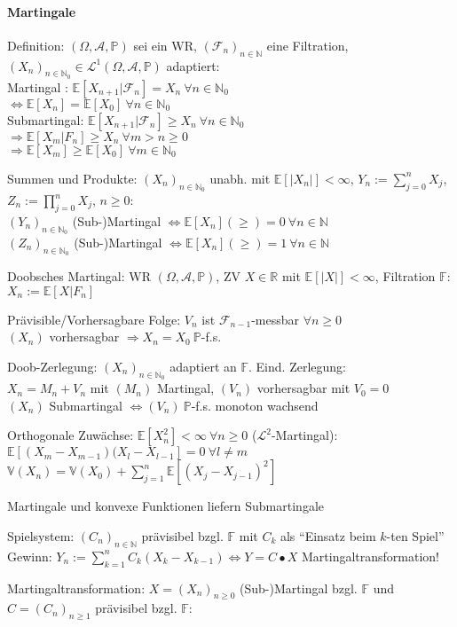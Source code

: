 \documentclass[a4paper,draft]{article}
\newcommand{\R}{\mathds{R}}
\newcommand{\N}{\mathds{N}}
\newcommand{\A}{\mathcal{A}}
\renewcommand{\P}{\mathds{P}}
\newcommand{\E}[1]{\mathds{E}[#1]}
\newcommand{\F}{\mathcal{F}}
\newcommand{\cE}[2]{\E{#1 | #2}}
\newcommand{\V}{\mathds{V}}
\newcommand{\parh}{\par\hangindent=0.5cm}
\renewcommand{\wr}{(\Omega,\A,\P)}
\begin{document}
\begin{multicols}{2}
\paragraph{Martingale}\hspace{0pt}\parh
Definition: $\wr$ sei ein WR, $(\F_n)_{n\in\N}$ eine Filtration, $(X_n)_{n\in\N_0} \in\mathcal{L}^1\wr$ adaptiert:\\
Martingal : $\cE{X_{n+1}}{\F_n}=X_n\:\forall n\in\N_0$\\
$\Longleftrightarrow \E{X_n} = \E{X_0} \:\forall n\in\N_0$\\
Submartingal: $\cE{X_{n+1}}{\F_n}\geq X_n\:\forall n\in\N_0$\\
$\Longrightarrow \cE{X_m}{F_n}\geq X_n\:\forall m>n\geq0$\\
$\Longrightarrow \E{X_m}\geq\E{X_0} \:\forall m\in\N_0$\parh
Summen und Produkte: $(X_n)_{n\in\N_0}$ unabh. mit $\E{|X_n|}<\infty$, $Y_n:=\sum_{j=0}^nX_j$, $Z_n:=\prod_{j=0}^n X_j$, $n\geq 0$:\\
$(Y_n)_{n\in\N_0}$ (Sub-)Martingal $\Longleftrightarrow \E{X_n}(\geq)=0 \:\forall n\in\N$\\
$(Z_n)_{n\in\N_0}$ (Sub-)Martingal $\Longleftrightarrow \E{X_n}(\geq)=1 \:\forall n\in\N$\parh
Doobsches Martingal: WR $\wr$, ZV $X\in\R$ mit $\E{|X|}<\infty$, Filtration $\mathds{F}$:\quad $X_n:=\cE{X}{F_n}$\parh
Prävisible/Vorhersagbare Folge: $V_n$ ist $\F_{n-1}$-messbar $\forall n\geq 0$\\
$(X_n)$ vorhersagbar $\Longrightarrow X_n=X_0\:\P$-f.s.\parh
Doob-Zerlegung: $(X_n)_{n\in\N_0}$ adaptiert an $\mathds{F}$. Eind. Zerlegung:\\
$X_n=M_n+V_n$ mit $(M_n)$ Martingal, $(V_n)$ vorhersagbar mit $V_0=0$\\
$(X_n)$ Submartingal $\Longleftrightarrow (V_n)\: \P$-f.s. monoton wachsend\parh
Orthogonale Zuwächse: $\E{X_n^2}<\infty \:\forall n\geq0$ ($\mathcal{L}^2$-Martingal):
$\E{(X_m-X_{m-1})(X_l-X_{l-1}}=0 \:\forall l\not =m$\\
$\V(X_n)=\V(X_0)+\sum_{j=1}^n\E{(X_j-X_{j-1})^2}$\parh
Martingale und konvexe Funktionen liefern Submartingale\parh
Spielsystem: $(C_n)_{n\in\N}$ prävisibel bzgl. $\mathds{F}$ mit $C_k$ als \enquote{Einsatz beim $k$-ten Spiel}\\
Gewinn: $Y_n:=\sum_{k=1}^n C_k(X_k-X_{k-1}) \Longleftrightarrow Y = C\bullet X$ Martingaltransformation!\parh
Martingaltransformation: $X=(X_n)_{n\geq 0}$ (Sub-)Martingal bzgl. $\mathds{F}$ und $C=(C_n)_{n\geq 1}$ prävisibel bzgl. $\mathds{F}$:\\

\end{multicols}
\end{document}

